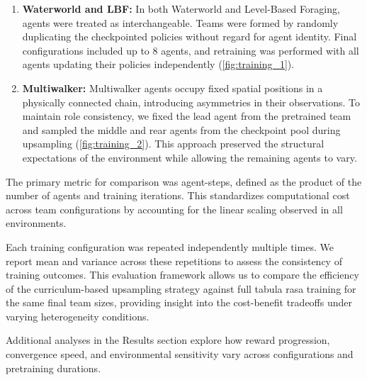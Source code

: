 \documentclass{article}
\begin{document}
\begin{enumerate}
    \item \textbf{Waterworld and LBF:}
    In both Waterworld and Level-Based Foraging, agents were treated as interchangeable. 
    Teams were formed by randomly duplicating the checkpointed policies without regard 
    for agent identity. Final configurations included up to 8 agents, and retraining was 
    performed with all agents updating their policies independently (\ref{fig:training_1}).
    \item \textbf{Multiwalker:}
    Multiwalker agents occupy fixed spatial positions in a physically connected chain, 
    introducing asymmetries in their observations. To maintain role consistency, 
    we fixed the lead agent from the pretrained team and sampled the middle and rear 
    agents from the checkpoint pool during upsampling (\ref{fig:training_2}). 
    This approach preserved the 
    structural expectations of the environment while allowing the remaining agents to vary. 
\end{enumerate}

The primary metric for comparison was agent-steps, defined as the product of the number of 
agents and training iterations. This standardizes computational cost across team configurations 
by accounting for the linear scaling observed in all environments.

Each training configuration was repeated independently multiple times. We report mean and 
variance across these repetitions to assess the consistency of training outcomes. 
This evaluation framework allows us to compare the efficiency of the curriculum-based 
upsampling strategy against full tabula rasa training for the same final team sizes, 
providing insight into the cost-benefit tradeoffs under varying heterogeneity conditions.

Additional analyses in the Results section explore how reward progression, convergence speed, 
and environmental sensitivity vary across configurations and pretraining durations.
\end{document}
